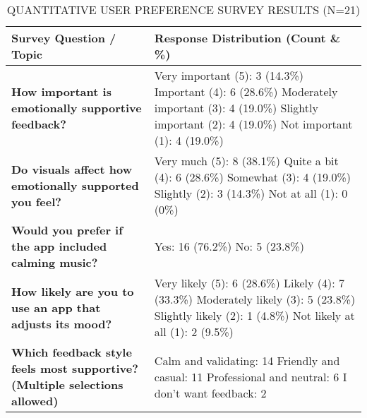\documentclass[conference]{IEEEtran}
\begin{document}
	\begin{table}[t]
		\caption{QUANTITATIVE USER PREFERENCE SURVEY RESULTS (N=21)}
		\label{tab:survey_results}
		\centering
		\begin{tabular}{|p{}|p{}|}
			\hline
			\textbf{Survey Question / Topic} & \textbf{Response Distribution (Count \& \%)} \\ \hline
			\textbf{How important is emotionally supportive feedback?} & 
			Very important (5): 3 (14.3\%) \newline 
			Important (4): 6 (28.6\%) \newline 
			Moderately important (3): 4 (19.0\%) \newline 
			Slightly important (2): 4 (19.0\%) \newline 
			Not important (1): 4 (19.0\%) \\ \hline
			\textbf{Do visuals affect how emotionally supported you feel?} & 
			Very much (5): 8 (38.1\%) \newline 
			Quite a bit (4): 6 (28.6\%) \newline 
			Somewhat (3): 4 (19.0\%) \newline 
			Slightly (2): 3 (14.3\%) \newline 
			Not at all (1): 0 (0\%) \\ \hline
			\textbf{Would you prefer if the app included calming music?} & 
			Yes: 16 (76.2\%) \newline 
			No: 5 (23.8\%) \\ \hline
			\textbf{How likely are you to use an app that adjusts its mood?} & 
			Very likely (5): 6 (28.6\%) \newline 
			Likely (4): 7 (33.3\%) \newline 
			Moderately likely (3): 5 (23.8\%) \newline 
			Slightly likely (2): 1 (4.8\%) \newline 
			Not likely at all (1): 2 (9.5\%) \\ \hline
			\textbf{Which feedback style feels most supportive? (Multiple selections allowed)} & 
			Calm and validating: 14 \newline 
			Friendly and casual: 11 \newline 
			Professional and neutral: 6 \newline 
			I don’t want feedback: 2 \\ \hline
		\end{tabular}
	\end{table}
	
\end{document}
